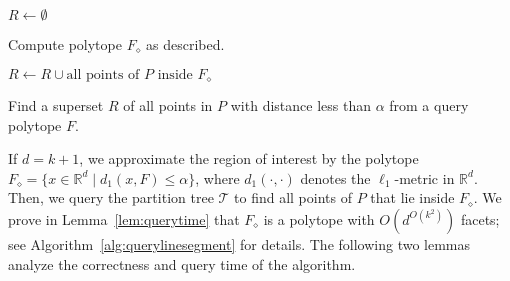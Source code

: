 \documentclass[a4paper,11pt]{paper}
\newcommand{\mathset}[1]{\ensuremath {\mathbb {#1}}}
\newcommand{\R}{\mathset{R}}
\newenvironment{alg}{\begin{algorithm}[htbp]}{\end{algorithm}}
\begin{document}
\begin{alg}
 $R \gets \emptyset$

   {
  \label{alg:querylinesegment:d2start}
 Compute polytope $F_{\diamond}$ as described.
 \label{querylinesegment:computerectangle}

 $R \gets R \cup \text{all points of $P$ inside $F_{\diamond}$}$
 \label{alg:querylinesegment:d2end}

 }
 \label{alg:querylinesegment:return}
\caption{Find a superset $R$ of all points in $P$ with distance
less than $\alpha$ from a query polytope $F$.}
 \label{alg:querylinesegment}
\end{alg}

If $d=k+1$, we approximate the region of interest by the
polytope
$F_{\diamond} = \{x \in \R^d \mid d_1(x, F) \leq \alpha\}$,
where $d_1(\cdot, \cdot)$ denotes the $\ell_1$-metric
in $\R^d$.
Then, we query the partition tree $\mathcal{T}$ to find all points
of $P$ that lie inside $F_{\diamond}$.
We prove in Lemma~\ref{lem:querytime} that $F_{\diamond}$ is
a polytope with
$O(d^{O(k^2)})$ facets;
see Algorithm~\ref{alg:querylinesegment} for details.
The following two lemmas analyze the correctness and
query time of the algorithm.
\end{document}
